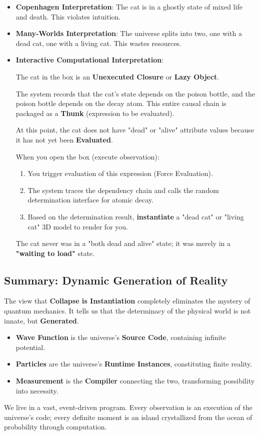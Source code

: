 \begin{itemize}
\item \textbf{Copenhagen Interpretation}: The cat is in a ghostly state of mixed life and death. This violates intuition.

\item \textbf{Many-Worlds Interpretation}: The universe splits into two, one with a dead cat, one with a living cat. This wastes resources.

\item \textbf{Interactive Computational Interpretation}:

  The cat in the box is an \textbf{Unexecuted Closure} or \textbf{Lazy Object}.

  The system records that the cat's state depends on the poison bottle, and the poison bottle depends on the decay atom. This entire causal chain is packaged as a \textbf{Thunk} (expression to be evaluated).

  At this point, the cat does not have "dead" or "alive" attribute values because it has not yet been \textbf{Evaluated}.

  When you open the box (execute observation):

  \begin{enumerate}
  \item You trigger evaluation of this expression (Force Evaluation).

  \item The system traces the dependency chain and calls the random determination interface for atomic decay.

  \item Based on the determination result, \textbf{instantiate} a "dead cat" or "living cat" 3D model to render for you.
  \end{enumerate}

  The cat never was in a "both dead and alive" state; it was merely in a \textbf{"waiting to load"} state.
\end{itemize}

\subsection{Summary: Dynamic Generation of Reality}

The view that \textbf{Collapse is Instantiation} completely eliminates the mystery of quantum mechanics. It tells us that the determinacy of the physical world is not innate, but \textbf{Generated}.

\begin{itemize}
\item \textbf{Wave Function} is the universe's \textbf{Source Code}, containing infinite potential.

\item \textbf{Particles} are the universe's \textbf{Runtime Instances}, constituting finite reality.

\item \textbf{Measurement} is the \textbf{Compiler} connecting the two, transforming possibility into necessity.
\end{itemize}

We live in a vast, event-driven program. Every observation is an execution of the universe's code; every definite moment is an island crystallized from the ocean of probability through computation.
